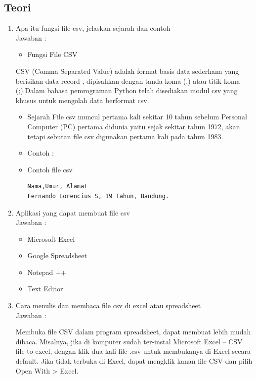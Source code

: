 \subsection{Teori}
\begin{enumerate}

\item Apa itu fungsi file csv, jelaskan sejarah dan contoh\\
Jawaban :

\begin{itemize}
\item Fungsi File CSV
\end{itemize}

CSV (Comma Separated Value) adalah format basis data sederhana yang berisikan data record , dipisahkan dengan tanda koma (,) atau titik koma (;).Dalam bahasa pemrograman Python telah disediakan modul  csv  yang khusus untuk mengolah data berformat csv.

\begin{itemize}
\item Sejarah 
File csv muncul pertama kali sekitar 10 tahun sebelum Personal Computer (PC) pertama  didunia yaitu sejak sekitar tahun 1972, akan tetapi sebutan file csv digunakan pertama kali pada tahun 1983.
					\item Contoh : 
\end{itemize}

\begin{itemize}
\item Contoh file csv
\begin{verbatim}
Nama,Umur, Alamat
Fernando Lorencius S, 19 Tahun, Bandung.
\end{verbatim}
\end{itemize}

\item Aplikasi yang dapat membuat file csv\\
Jawaban :

\begin{itemize}
\item Microsoft Excel
\item Google Spreadsheet
\item Notepad ++
\item Text Editor
\end{itemize}

\item  Cara menulis dan membaca file csv di excel atau spreadsheet\\
Jawaban :

Membuka file CSV dalam program spreadsheet, dapat membuat lebih mudah dibaca. Misalnya, jika di komputer sudah ter-instal Microsoft Excel -- CSV file to excel, dengan klik dua kali file .csv untuk membukanya di Excel secara default. Jika tidak terbuka di Excel, dapat mengklik kanan file CSV dan pilih Open With > Excel.


\end{enumerate}
